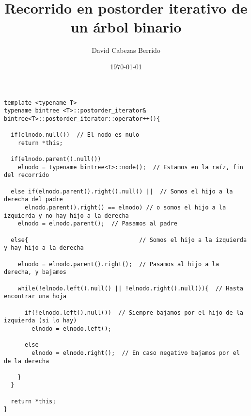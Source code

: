 \documentclass{article}
\begin{document}
\title{Recorrido en postorder iterativo de un árbol binario}
\author{David Cabezas Berrido}
\date{\today}
\maketitle

\begin{justify}
  
\end{justify}

\begin{verbatim}
template <typename T>
typename bintree <T>::postorder_iterator&
bintree<T>::postorder_iterator::operator++(){

  if(elnodo.null())  // El nodo es nulo
    return *this;

  if(elnodo.parent().null())
    elnodo = typename bintree<T>::node();  // Estamos en la raíz, fin del recorrido

  else if(elnodo.parent().right().null() ||  // Somos el hijo a la derecha del padre
	  elnodo.parent().right() == elnodo) // o somos el hijo a la izquierda y no hay hijo a la derecha
    elnodo = elnodo.parent();  // Pasamos al padre

  else{                                // Somos el hijo a la izquierda y hay hijo a la derecha

    elnodo = elnodo.parent().right();  // Pasamos al hijo a la derecha, y bajamos

    while(!elnodo.left().null() || !elnodo.right().null()){  // Hasta encontrar una hoja

      if(!elnodo.left().null())  // Siempre bajamos por el hijo de la izquierda (si lo hay)
        elnodo = elnodo.left();

      else
        elnodo = elnodo.right();  // En caso negativo bajamos por el de la derecha

    }
  }

  return *this;
}  
\end{verbatim}
\end{document}
